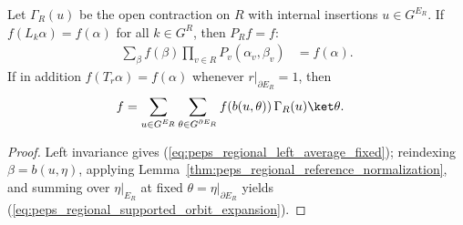 \begin{lemma}%
    \label{thm:peps_regional_invariant_expansion}
    \leanok
    Let $\Gamma_R(u)$ be the open contraction on $R$ with internal insertions $u\in G^{E_R}$. If $f(L_k\alpha)=f(\alpha)$ for all $k\in G^R$, then $P_Rf=f$:
    \begin{align}
        \sum_\beta f(\beta)\prod_{v\in R}P_v(\alpha_v,\beta_v) & =f(\alpha).
        \label{eq:peps_regional_left_average_fixed}
    \end{align}
    If in addition $f(T_r\alpha)=f(\alpha)$ whenever $r|_{\partial E_R}=1$, then
    \begin{align}
        f & =\sum_{u\in G^{E_R}}\sum_{\theta\in G^{\partial E_R}}
        f(b(u,\theta))\,\Gamma_R(u)\ket\theta.
        \label{eq:peps_regional_supported_orbit_expansion}
    \end{align}
\end{lemma}
\begin{proof}\leanok
    Left invariance gives (\ref{eq:peps_regional_left_average_fixed}); reindexing $\beta=b(u,\eta)$, applying Lemma~\ref{thm:peps_regional_reference_normalization}, and summing over $\eta|_{E_R}$ at fixed $\theta=\eta|_{\partial E_R}$ yields (\ref{eq:peps_regional_supported_orbit_expansion}).
\end{proof}

